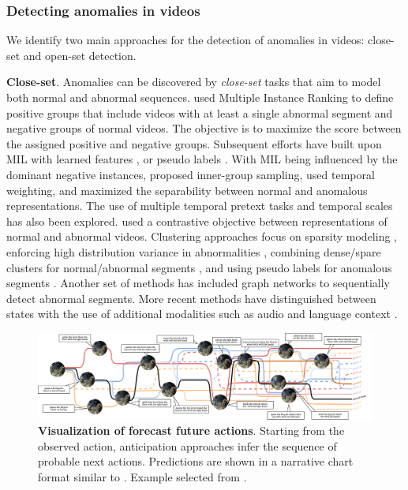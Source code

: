 \subsubsection{Detecting anomalies in videos}

We identify two main approaches for the detection of anomalies in videos: close-set and open-set detection.

\noindent
\textbf{Close-set}. Anomalies can be discovered by \emph{close-set} tasks that aim to model both normal and abnormal sequences. \citet{sultani2018real} used Multiple Instance Ranking \citep{dietterich1997solving} to define positive groups that include videos with at least a single abnormal segment and negative groups of normal videos. The objective is to maximize the score between the assigned positive and negative groups. Subsequent efforts have built upon MIL with learned features \citep{dubey20193d}, or pseudo labels \citep{feng2021mist}. With MIL being influenced by the dominant negative instances, \citet{zhang2019temporal} proposed inner-group sampling, \citet{pu2023learning,zhu2019motion} used temporal weighting, and \citet{tian2021weakly} maximized the separability between normal and anomalous representations. The use of multiple temporal pretext tasks \citep{almarri2024multi,georgescu2021anomaly} and temporal scales \citep{li2022scale} has also been explored. \citet{chen2023mgfn} used a contrastive objective between representations of normal and abnormal videos. Clustering approaches focus on sparsity modeling \citep{lu2013abnormal}, enforcing high distribution variance in abnormalities \citep{li2021deep}, combining dense/spare clusters for normal/abnormal segments \citep{zaheer2020claws}, and using pseudo labels for anomalous segments \citep{zaheer2020self}. Another set of methods \citep{zhong2019graph,purwanto2021dance} has included graph networks to sequentially detect abnormal segments. More recent methods have distinguished between states with the use of additional modalities such as audio \citep{wu2020not} and language context \citep{yang2024text,zanella2024harnessing}.


\begin{figure}[!ht]
    \centering
    \includegraphics[width=\linewidth,trim={0cm 0 0cm 0},clip]{figs/narrative_chart_ego_exo.pdf}
    \caption{\textbf{Visualization of forecast future actions}. Starting from the observed action, anticipation approaches infer the sequence of probable next actions. Predictions are shown in a narrative chart format similar to \citet{randal2009movie}.
    Example selected from \citet{grauman2024ego}.} 
    \label{fig:narration_chart}
\end{figure}

